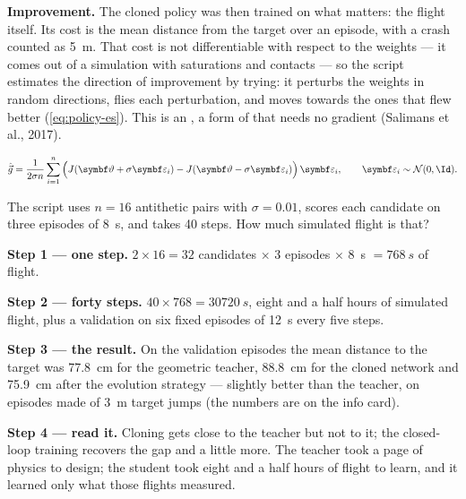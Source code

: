 \textbf{Improvement.} The cloned policy was then trained on what matters: the flight itself. Its cost is the mean distance from the target over an episode, with a crash counted as \SI{5}{m}. That cost is not differentiable with respect to the weights — it comes out of a simulation with saturations and contacts — so the script estimates the direction of improvement by trying: it perturbs the weights in random directions, flies each perturbation, and moves towards the ones that flew better (\cref{eq:policy-es}). This is an , a form of  that needs no gradient (Salimans et al., 2017).

\begin{equation}\label{eq:policy-es}
  \hat{\vec g} = \frac{1}{2\sigma n}\sum_{i=1}^{n}\Big(J(\symbf\vartheta + \sigma\symbf\varepsilon_i) - J(\symbf\vartheta - \sigma\symbf\varepsilon_i)\Big)\,\symbf\varepsilon_i,\qquad \symbf\varepsilon_i \sim \mathcal N(0, \Id) .
\end{equation}

\begin{example}
\label{ex:policy-es-cost}
The script uses $n = 16$ antithetic pairs with $\sigma = 0.01$, scores each candidate on three episodes of \SI{8}{s}, and takes 40 steps. How much simulated flight is that?

\textbf{Step 1 — one step.} $2 \times 16 = 32$ candidates $\times$ 3 episodes $\times$ \SI{8}{s} $= \SI{768}{s}$ of flight.

\textbf{Step 2 — forty steps.} $40 \times 768 = \SI{30720}{s}$, eight and a half hours of simulated flight, plus a validation on six fixed episodes of \SI{12}{s} every five steps.

\textbf{Step 3 — the result.} On the validation episodes the mean distance to the target was \SI{77.8}{cm} for the geometric teacher, \SI{88.8}{cm} for the cloned network and \SI{75.9}{cm} after the evolution strategy — slightly better than the teacher, on episodes made of \SI{3}{m} target jumps (the numbers are on the info card).

\textbf{Step 4 — read it.} Cloning gets close to the teacher but not to it; the closed-loop training recovers the gap and a little more. The teacher took a page of physics to design; the student took eight and a half hours of flight to learn, and it learned only what those flights measured.
\end{example}

